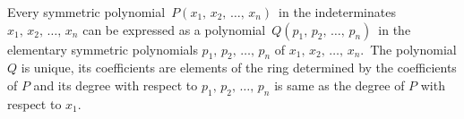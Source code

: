 \documentclass[12pt]{article}
\theoremstyle{definition}
\begin{document}
Every symmetric polynomial \,$P(x_1,\,x_2,\,\ldots,\,x_n)$\, in the indeterminates $x_1,\,x_2,\,\ldots,\,x_n$ can be expressed as a polynomial \,$Q(p_1,\,p_2,\,\ldots,\,p_n)$\, in the elementary symmetric polynomials 
$p_1,\,p_2,\,\ldots,\,p_n$ of $x_1,\,x_2,\,\ldots,\,x_n$.\, The polynomial $Q$ is unique, its coefficients are elements of the ring determined by the coefficients of $P$ and its degree with respect to $p_1,\,p_2,\,\ldots,\,p_n$ is same as the degree of $P$ with respect to $x_1$.
\end{document}
